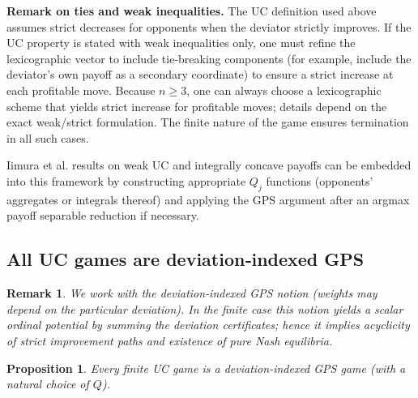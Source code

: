 \documentclass[11pt]{article}
\newtheorem{proposition}[theorem]{Proposition}
\newtheorem{remark}[theorem]{Remark}
\begin{document}
\textbf{Remark on ties and weak inequalities.} The UC definition used above
assumes strict decreases for opponents when the deviator strictly improves.
If the UC property is stated with weak inequalities only, one must refine
the lexicographic vector to include tie‑breaking components (for example,
include the deviator's own payoff as a secondary coordinate) to ensure a
strict increase at each profitable move. Because \(n\ge3\), one can always
choose a lexicographic scheme that yields strict increase for profitable
moves; details depend on the exact weak/strict formulation. The finite
nature of the game ensures termination in all such cases.

Iimura et al. results on weak UC and integrally concave payoffs can be embedded
into this framework by constructing appropriate \(Q_j\) functions (opponents'
aggregates or integrals thereof) and applying the GPS argument after an
argmax payoff separable reduction if necessary.



\subsection{All UC games are deviation‑indexed GPS}
\begin{remark}
We work with the deviation‑indexed GPS notion (weights may depend on the particular deviation). In the finite case this notion yields a scalar ordinal potential by summing the deviation certificates; hence it implies acyclicity of strict improvement paths and existence of pure Nash equilibria.
\end{remark}

\begin{proposition}\label{prop:UC->GPS}
Every finite UC game is a deviation‑indexed GPS game (with a natural choice of $Q$).
\end{proposition}
\end{document}

